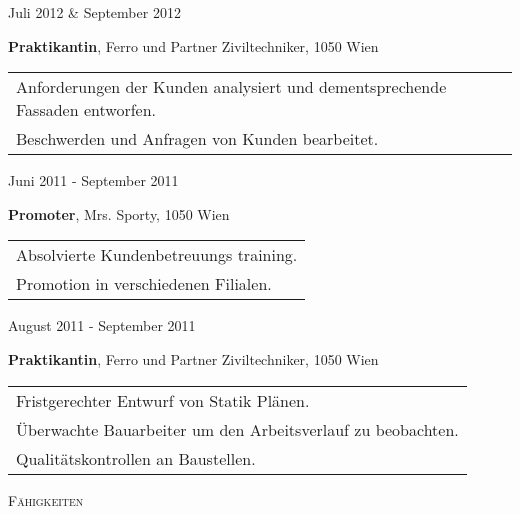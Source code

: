 \documentclass{article}
\newenvironment{changemargin}[2]{%
  \begin{list}{}{%
    \setlength{\topsep}{0pt}%
    \setlength{\leftmargin}{#1}%
    \setlength{\rightmargin}{#2}%
    \setlength{\listparindent}{\parindent}%
    \setlength{\itemindent}{\parindent}%
    \setlength{\parsep}{\parskip}%
  }%
  \item[]}{\end{list}
}
\newcommand{\header}[1]{
	\begin{changemargin}{-0.5in}{-0.5in}
		\large \textsc{#1}\\
		\vspace{-10pt}
		\raggedright
		\color{dark_grey}{\line(1,0){500}}
		\smallskip
	\end{changemargin}
}
\newenvironment{body} {
	\vspace*{-16pt}
	\begin{changemargin}{0in}{0in}
  }	
	{
\end{changemargin}
\medskip
}
\newcommand{\paraW}[4]{
	\begin{minipage}[t]{0.6\textwidth}
	\textbf{#1}, #2, #3 \vspace{2pt}\\
	\begin{tabular}{p{10cm}}
		#4
	\end{tabular}
	\end{minipage}
	\medskip
}
\newcommand{\timerange}[1]{
	\begin{minipage}[t]{0.30\textwidth}
		#1
	\end{minipage}
}
\begin{document}
\begin{body}
	\timerange{Juli 2012 \& September 2012}
	\paraW{Praktikantin}{Ferro und Partner Ziviltechniker}{1050 Wien}{
		Anforderungen der Kunden analysiert und dementsprechende Fassaden entworfen.\\
		Beschwerden und Anfragen von Kunden bearbeitet.\\
	}

	\timerange{Juni 2011 - September 2011}
	\paraW{Promoter}{Mrs. Sporty}{1050 Wien}{
		Absolvierte Kundenbetreuungs training.\\
		Promotion in verschiedenen Filialen.\\
	}


		\timerange{August 2011 - September 2011}
	\paraW{Praktikantin}{Ferro und Partner Ziviltechniker}{1050 Wien}{
		Fristgerechter Entwurf von Statik Pl{\"a}nen.\\
		{\"U}berwachte Bauarbeiter um den Arbeitsverlauf zu beobachten.\\
		Qualitätskontrollen an Baustellen.\\
	}

\end{body}


\header{F{\"a}higkeiten}
\end{document}
